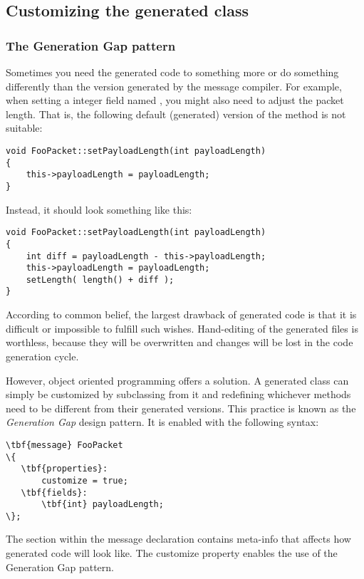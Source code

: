\subsection{Customizing the generated class}


\subsubsection{The Generation Gap pattern}

Sometimes you need the generated code to something
more or do something differently than the version generated
by the message compiler.
For example, when setting a integer field named ,
you might also need to adjust the packet length. That is,
the following default (generated) version of the
 method is not suitable:

\begin{verbatim}
void FooPacket::setPayloadLength(int payloadLength)
{
    this->payloadLength = payloadLength;
}
\end{verbatim}

Instead, it should look something like this:

\begin{verbatim}
void FooPacket::setPayloadLength(int payloadLength)
{
    int diff = payloadLength - this->payloadLength;
    this->payloadLength = payloadLength;
    setLength( length() + diff );
}
\end{verbatim}

According to common belief, the largest drawback of generated code
is that it is difficult or impossible to fulfill such wishes.
Hand-editing of the generated files is worthless, because
they will be overwritten and changes will be lost
in the code generation cycle.

However, object oriented programming offers a solution.
A generated class can simply be customized by subclassing
from it and redefining whichever methods need to be
different from their generated versions. This practice
is known as the \textit{Generation Gap} design pattern.
It is enabled with the following syntax:

\begin{Verbatim}[commandchars=\\\{\}]
\tbf{message} FooPacket
\{
   \tbf{properties}:
       customize = true;
   \tbf{fields}:
       \tbf{int} payloadLength;
\};
\end{Verbatim}

The  section within the message declaration contains
meta-info that affects how generated code will look like.
The customize property enables the use of the Generation Gap
pattern.

